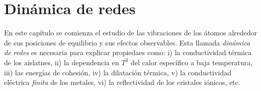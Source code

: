 
\chapter{Dinámica de redes} \label{Ch:04}

En este capítulo se comienza el estudio de las vibraciones de los átomos alrededor de sus posiciones de equilibrio y sus efectos observables. Esta llamada \textit{dinámica de redes} es necesaria para explicar propiedaes como: i) la conductividad térmica de los aislatnes, ii) la dependencia en $T^3$ del calor específico a baja temperatura, iii) las energías de cohesión, iv) la dilatación térmica, v) la conductividad eléctrica \textit{finita} de los metales, vi) la reflectividad de los cristales iónicos, etc.